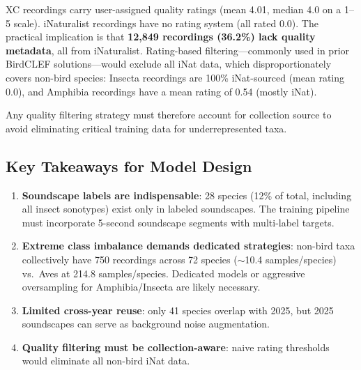 XC recordings carry user-assigned quality ratings (mean 4.01, median 4.0 on a 1--5 scale).
iNaturalist recordings have no rating system (all rated 0.0).
The practical implication is that \textbf{12{,}849 recordings (36.2\%) lack quality metadata},
all from iNaturalist. Rating-based filtering---commonly used in prior BirdCLEF solutions---would
exclude all iNat data, which disproportionately covers non-bird species:
Insecta recordings are 100\% iNat-sourced (mean rating 0.0),
and Amphibia recordings have a mean rating of 0.54 (mostly iNat).

Any quality filtering strategy must therefore account for collection source to avoid
eliminating critical training data for underrepresented taxa.

\subsection{Key Takeaways for Model Design}
\label{sec:eda:takeaways}

\begin{enumerate}
    \item \textbf{Soundscape labels are indispensable}: 28 species (12\% of total,
          including all insect sonotypes) exist only in labeled soundscapes.
          The training pipeline must incorporate 5-second soundscape segments
          with multi-label targets.
    \item \textbf{Extreme class imbalance demands dedicated strategies}:
          non-bird taxa collectively have 750 recordings across 72 species
          ($\sim$10.4 samples/species) vs.\ Aves at 214.8 samples/species.
          Dedicated models or aggressive oversampling for Amphibia/Insecta
          are likely necessary.
    \item \textbf{Limited cross-year reuse}: only 41 species overlap with 2025,
          but 2025 soundscapes can serve as background noise augmentation.
    \item \textbf{Quality filtering must be collection-aware}: naive rating
          thresholds would eliminate all non-bird iNat data.
\end{enumerate}
